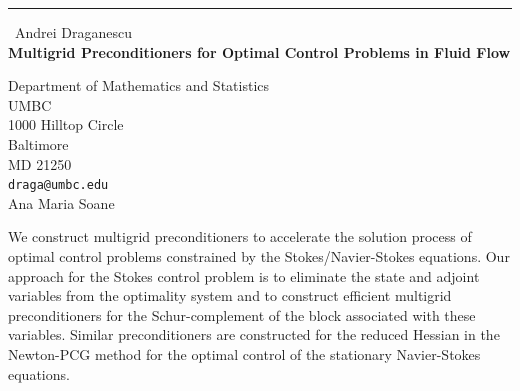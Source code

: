 \documentclass{report}
\begin{document}
\begin{center}
\rule{6in}{1pt} \
{\large Andrei Draganescu \\
{\bf Multigrid Preconditioners for Optimal Control Problems in Fluid Flow}}

Department of Mathematics and Statistics \\ UMBC \\ 1000 Hilltop Circle \\ Baltimore \\ MD 21250
\\
{\tt draga@umbc.edu}\\
Ana Maria Soane\end{center}

We construct multigrid preconditioners to accelerate the solution process
of optimal control problems constrained by the Stokes/Navier-Stokes
equations. Our approach for the Stokes control problem is to eliminate
the state and adjoint variables from the optimality system and to
construct efficient multigrid preconditioners for the Schur-complement of
the block associated with these variables. Similar preconditioners are
constructed for the reduced Hessian in the Newton-PCG method for the
optimal control of the stationary Navier-Stokes equations.
\end{document}
